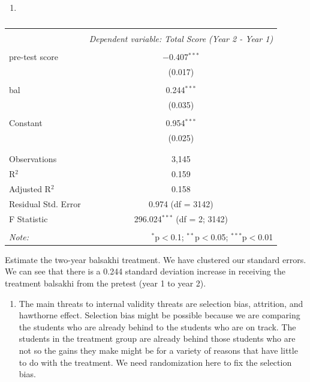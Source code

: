 \documentclass[
  12pt,
  landscape]{article}
\providecommand{\tightlist}{%
  \setlength{\itemsep}{0pt}\setlength{\parskip}{0pt}}
\begin{document}
\begin{enumerate}
\def\labelenumi{(\alph{enumi})}
\setcounter{enumi}{4}
\item
\end{enumerate}

\begin{table}[H] \centering 
  \caption{} 
  \label{} 
\begin{tabular}{@{\extracolsep{5pt}}lc} 
\\[-1.8ex]\hline 
\hline \\[-1.8ex] 
 & \multicolumn{1}{c}{\textit{Dependent variable: Total Score (Year 2 - Year 1)}} \\ 
\cline{2-2} 
\hline \\[-1.8ex] 
 pre-test score & $-$0.407$^{***}$ \\ 
  & (0.017) \\ 
  & \\ 
 bal & 0.244$^{***}$ \\ 
  & (0.035) \\ 
  & \\ 
 Constant & 0.954$^{***}$ \\ 
  & (0.025) \\ 
  & \\ 
\hline \\[-1.8ex] 
Observations & 3,145 \\ 
R$^{2}$ & 0.159 \\ 
Adjusted R$^{2}$ & 0.158 \\ 
Residual Std. Error & 0.974 (df = 3142) \\ 
F Statistic & 296.024$^{***}$ (df = 2; 3142) \\ 
\hline 
\hline \\[-1.8ex] 
\textit{Note:}  & \multicolumn{1}{r}{$^{*}$p$<$0.1; $^{**}$p$<$0.05; $^{***}$p$<$0.01} \\ 
\end{tabular} 
\end{table}

Estimate the two-year balsakhi treatment. We have clustered our standard
errors. We can see that there is a 0.244 standard deviation increase in
receiving the treatment balsakhi from the pretest (year 1 to year 2).

\begin{enumerate}
\def\labelenumi{(\alph{enumi})}
\setcounter{enumi}{5}
\tightlist
\item
  The main threats to internal validity threats are selection bias,
  attrition, and hawthorne effect. Selection bias might be possible
  because we are comparing the students who are already behind to the
  students who are on track. The students in the treatment group are
  already behind those students who are not so the gains they make might
  be for a variety of reasons that have little to do with the treatment.
  We need randomization here to fix the selection bias.
\end{enumerate}
\end{document}
